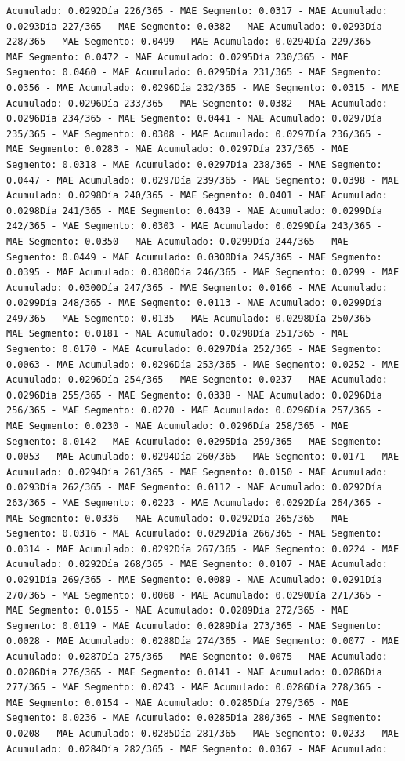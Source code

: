 \documentclass[
]{book}
\begin{document}
\begin{verbatim}
Acumulado: 0.0292Día 226/365 - MAE Segmento: 0.0317 - MAE Acumulado: 0.0293Día 227/365 - MAE Segmento: 0.0382 - MAE Acumulado: 0.0293Día 228/365 - MAE Segmento: 0.0499 - MAE Acumulado: 0.0294Día 229/365 - MAE Segmento: 0.0472 - MAE Acumulado: 0.0295Día 230/365 - MAE Segmento: 0.0460 - MAE Acumulado: 0.0295Día 231/365 - MAE Segmento: 0.0356 - MAE Acumulado: 0.0296Día 232/365 - MAE Segmento: 0.0315 - MAE Acumulado: 0.0296Día 233/365 - MAE Segmento: 0.0382 - MAE Acumulado: 0.0296Día 234/365 - MAE Segmento: 0.0441 - MAE Acumulado: 0.0297Día 235/365 - MAE Segmento: 0.0308 - MAE Acumulado: 0.0297Día 236/365 - MAE Segmento: 0.0283 - MAE Acumulado: 0.0297Día 237/365 - MAE Segmento: 0.0318 - MAE Acumulado: 0.0297Día 238/365 - MAE Segmento: 0.0447 - MAE Acumulado: 0.0297Día 239/365 - MAE Segmento: 0.0398 - MAE Acumulado: 0.0298Día 240/365 - MAE Segmento: 0.0401 - MAE Acumulado: 0.0298Día 241/365 - MAE Segmento: 0.0439 - MAE Acumulado: 0.0299Día 242/365 - MAE Segmento: 0.0303 - MAE Acumulado: 0.0299Día 243/365 - MAE Segmento: 0.0350 - MAE Acumulado: 0.0299Día 244/365 - MAE Segmento: 0.0449 - MAE Acumulado: 0.0300Día 245/365 - MAE Segmento: 0.0395 - MAE Acumulado: 0.0300Día 246/365 - MAE Segmento: 0.0299 - MAE Acumulado: 0.0300Día 247/365 - MAE Segmento: 0.0166 - MAE Acumulado: 0.0299Día 248/365 - MAE Segmento: 0.0113 - MAE Acumulado: 0.0299Día 249/365 - MAE Segmento: 0.0135 - MAE Acumulado: 0.0298Día 250/365 - MAE Segmento: 0.0181 - MAE Acumulado: 0.0298Día 251/365 - MAE Segmento: 0.0170 - MAE Acumulado: 0.0297Día 252/365 - MAE Segmento: 0.0063 - MAE Acumulado: 0.0296Día 253/365 - MAE Segmento: 0.0252 - MAE Acumulado: 0.0296Día 254/365 - MAE Segmento: 0.0237 - MAE Acumulado: 0.0296Día 255/365 - MAE Segmento: 0.0338 - MAE Acumulado: 0.0296Día 256/365 - MAE Segmento: 0.0270 - MAE Acumulado: 0.0296Día 257/365 - MAE Segmento: 0.0230 - MAE Acumulado: 0.0296Día 258/365 - MAE Segmento: 0.0142 - MAE Acumulado: 0.0295Día 259/365 - MAE Segmento: 0.0053 - MAE Acumulado: 0.0294Día 260/365 - MAE Segmento: 0.0171 - MAE Acumulado: 0.0294Día 261/365 - MAE Segmento: 0.0150 - MAE Acumulado: 0.0293Día 262/365 - MAE Segmento: 0.0112 - MAE Acumulado: 0.0292Día 263/365 - MAE Segmento: 0.0223 - MAE Acumulado: 0.0292Día 264/365 - MAE Segmento: 0.0336 - MAE Acumulado: 0.0292Día 265/365 - MAE Segmento: 0.0316 - MAE Acumulado: 0.0292Día 266/365 - MAE Segmento: 0.0314 - MAE Acumulado: 0.0292Día 267/365 - MAE Segmento: 0.0224 - MAE Acumulado: 0.0292Día 268/365 - MAE Segmento: 0.0107 - MAE Acumulado: 0.0291Día 269/365 - MAE Segmento: 0.0089 - MAE Acumulado: 0.0291Día 270/365 - MAE Segmento: 0.0068 - MAE Acumulado: 0.0290Día 271/365 - MAE Segmento: 0.0155 - MAE Acumulado: 0.0289Día 272/365 - MAE Segmento: 0.0119 - MAE Acumulado: 0.0289Día 273/365 - MAE Segmento: 0.0028 - MAE Acumulado: 0.0288Día 274/365 - MAE Segmento: 0.0077 - MAE Acumulado: 0.0287Día 275/365 - MAE Segmento: 0.0075 - MAE Acumulado: 0.0286Día 276/365 - MAE Segmento: 0.0141 - MAE Acumulado: 0.0286Día 277/365 - MAE Segmento: 0.0243 - MAE Acumulado: 0.0286Día 278/365 - MAE Segmento: 0.0154 - MAE Acumulado: 0.0285Día 279/365 - MAE Segmento: 0.0236 - MAE Acumulado: 0.0285Día 280/365 - MAE Segmento: 0.0208 - MAE Acumulado: 0.0285Día 281/365 - MAE Segmento: 0.0233 - MAE Acumulado: 0.0284Día 282/365 - MAE Segmento: 0.0367 - MAE Acumulado: 
\end{verbatim}
\end{document}
